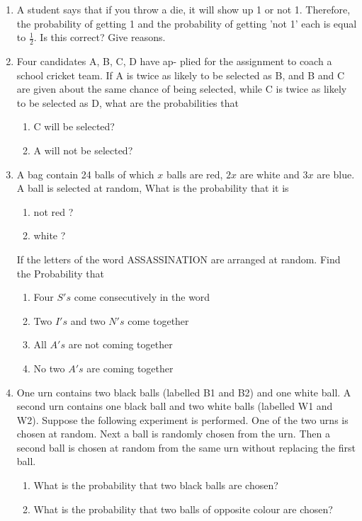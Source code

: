 \begin{enumerate}[label=\thesection.\arabic*,ref=\thesection.\theenumi]
\begin{enumerate}
\end{enumerate}
\solution
 \item A student says that if you throw a die, it will show up 1 or not 1. Therefore, the probability of getting 1 and the probability of getting 'not 1' each is equal to $\frac{1}{2}$. Is this correct? Give reasons.\\
 \solution
   \item Four candidates A, B, C, D have ap-
plied for the assignment to coach a school cricket
team. If A is twice as likely to be selected as B, and
B and C are given about the same chance of being
selected, while C is twice as likely to be selected
as D, what are the probabilities that
\begin{enumerate}
\item C will be selected?
\item A will not be selected?
\end{enumerate}
 \item A bag contain 24 balls of which $x$ balls are red, $2x$ are white and $3x$ are blue. A ball is selected at random, What is the probability that it is
\begin{enumerate}[label=\alph*)]
\item not red ?
\item white ?
\end{enumerate}
%
If the letters of the word ASSASSINATION are arranged at random. Find the Probability that
\begin{enumerate}[label=(\alph*)]
\item Four $S's$ come consecutively in the word
\item Two  $I's$ and two $N's$ come together
\item All $A's$ are not coming together
\item No two $A's$ are coming together
\end{enumerate}
%
	\item One urn contains two black balls (labelled B1 and B2) and one white ball. A
	second urn contains one black ball and two white balls (labelled W1 and W2).
	Suppose the following experiment is performed. One of the two urns is chosen
	at random. Next a ball is randomly chosen from the urn. Then a second ball is
	chosen at random from the same urn without replacing the first ball.
	
	\begin{enumerate}
	\item What is the probability that two black balls are chosen?
	
	\item What is the probability that two balls of opposite colour are chosen?
	\end{enumerate}
	\solution
\end{enumerate}
